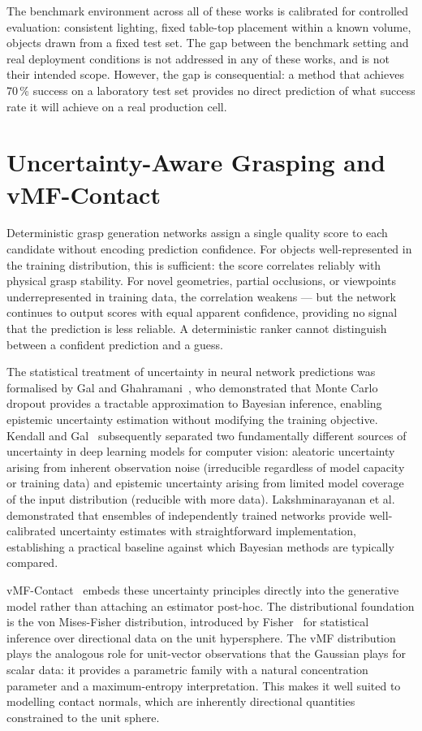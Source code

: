 \documentclass[12pt, a4paper]{report}
\begin{document}
The benchmark environment across all of these works is calibrated for controlled evaluation: consistent lighting, fixed table-top placement within a known volume, objects drawn from a fixed test set. The gap between the benchmark setting and real deployment conditions is not addressed in any of these works, and is not their intended scope. However, the gap is consequential: a method that achieves 70\,\% success on a laboratory test set provides no direct prediction of what success rate it will achieve on a real production cell.

\section{Uncertainty-Aware Grasping and vMF-Contact}
\label{sec:uncertainty-aware-grasping}

Deterministic grasp generation networks assign a single quality score to each candidate without encoding prediction confidence. For objects well-represented in the training distribution, this is sufficient: the score correlates reliably with physical grasp stability. For novel geometries, partial occlusions, or viewpoints underrepresented in training data, the correlation weakens --- but the network continues to output scores with equal apparent confidence, providing no signal that the prediction is less reliable. A deterministic ranker cannot distinguish between a confident prediction and a guess.

The statistical treatment of uncertainty in neural network predictions was formalised by Gal and Ghahramani~\cite{gal2016dropout}, who demonstrated that Monte Carlo dropout provides a tractable approximation to Bayesian inference, enabling epistemic uncertainty estimation without modifying the training objective. Kendall and Gal~\cite{kendall2017uncertainties} subsequently separated two fundamentally different sources of uncertainty in deep learning models for computer vision: aleatoric uncertainty arising from inherent observation noise (irreducible regardless of model capacity or training data) and epistemic uncertainty arising from limited model coverage of the input distribution (reducible with more data). Lakshminarayanan et al.~\cite{lakshminarayanan2017simple} demonstrated that ensembles of independently trained networks provide well-calibrated uncertainty estimates with straightforward implementation, establishing a practical baseline against which Bayesian methods are typically compared.

vMF-Contact~\cite{shi2025} embeds these uncertainty principles directly into the generative model rather than attaching an estimator post-hoc. The distributional foundation is the von Mises-Fisher distribution, introduced by Fisher~\cite{fisher1953dispersion} for statistical inference over directional data on the unit hypersphere. The vMF distribution plays the analogous role for unit-vector observations that the Gaussian plays for scalar data: it provides a parametric family with a natural concentration parameter and a maximum-entropy interpretation. This makes it well suited to modelling contact normals, which are inherently directional quantities constrained to the unit sphere.
\end{document}
